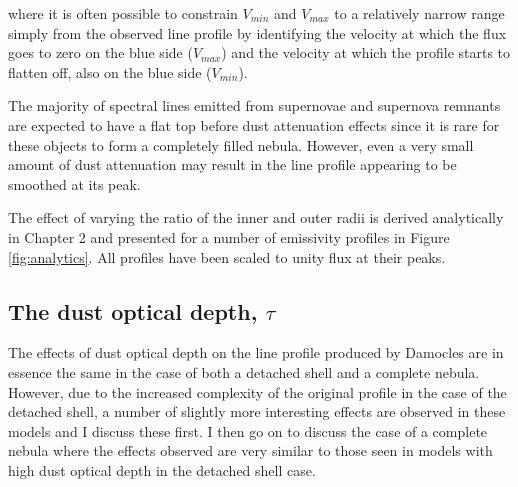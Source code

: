 \noindent where it is often possible to constrain $V_{min}$ and $V_{max}$ 
to a relatively narrow range simply from the observed line profile by identifying the velocity at which the flux goes to zero on the blue side ($V_{max}$) and the velocity at which the profile starts to flatten off, also on the blue side ($V_{min}$).

The majority of spectral lines emitted from supernovae and supernova 
remnants are expected to have a flat top before dust attenuation effects since it is rare for these 
objects to form a completely filled nebula.  However, even a very small amount of 
dust attenuation may result in the line profile appearing to be smoothed at its 
peak.

The effect of varying the ratio of the inner and outer radii is derived analytically in Chapter 2 and presented for a number of emissivity profiles in Figure \ref{fig:analytics}.   All profiles have been scaled to unity flux at their peaks.



\subsection{The dust optical depth, $\tau$}
\label{tau}

The effects of dust optical depth on the line profile produced by Damocles are in essence the same in the case of both a detached shell and a complete nebula.  However, due to the increased complexity of the original profile in the case of the detached shell, a number of slightly more interesting effects are observed in these models and I discuss these first.  I then go on to discuss the case of a complete nebula where the effects observed are very similar to those seen in models with high dust optical depth in the detached shell case.



